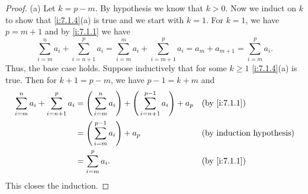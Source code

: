 \begin{proof}{(a)}
  Let \(k = p - m\).
  By hypothesis we know that \(k > 0\).
  Now we induct on \(k\) to show that \cref{i:7.1.4}(a) is true and we start with \(k = 1\).
  For \(k = 1\), we have \(p = m + 1\) and by \cref{i:7.1.1} we have
  \[
    \sum_{i = m}^n a_i + \sum_{i = n + 1}^p a_i = \sum_{i = m}^m a_i + \sum_{i = m + 1}^p a_i = a_m + a_{m + 1} = \sum_{i = m}^p a_i.
  \]
  Thus, the base case holds.
  Suppose inductively that for some \(k \geq 1\) \cref{i:7.1.4}(a) is true.
  Then for \(k + 1 = p - m\), we have \(p - 1 = k + m\) and
  \begin{align*}
    \sum_{i = m}^n a_i + \sum_{i = n + 1}^p a_i & = \Bigg(\sum_{i = m}^n a_i\Bigg) + \Bigg(\sum_{i = n + 1}^{p - 1} a_i\Bigg) + a_p &  & \by{i:7.1.1} \\
                                                & = \Bigg(\sum_{i = m}^{p - 1} a_i\Bigg) + a_p                                      &  & \byIH        \\
                                                & = \sum_{i = m}^p a_i.                                                             &  & \by{i:7.1.1}
  \end{align*}
  This closes the induction.
\end{proof}

